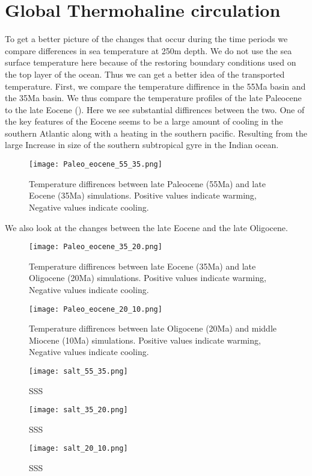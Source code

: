 \section{Global Thermohaline circulation}
To get a better picture of the changes that occur during the time periods we compare differences in sea temperature at 250m depth. We do not use the sea surface temperature here because of the restoring boundary conditions used on the top layer of the ocean. Thus we can get a better idea of the transported temperature. First, we compare the temperature diffirence in the 55Ma basin and the 35Ma basin. We thus compare the temperature profiles of the late Paleocene to the late Eocene (). Here we see substantial diffirences between the two. One of the key features of the Eocene seems to be a large amount of cooling in the southern Atlantic along with a heating in the southern pacific. Resulting from the large Increase in size of the southern subtropical gyre in the Indian ocean. 

\begin{figure}[H]
	\texttt{[image: Paleo\_eocene\_55\_35.png]}
	\caption{Temperature diffirences between late Paleocene (55Ma) and late Eocene (35Ma) simulations. Positive values indicate warming, Negative values indicate cooling.}
	\label{fig:5535cooling}
\end{figure}

We also look at the changes between the late Eocene and the late Oligocene. 

\begin{figure}[H]
	\texttt{[image: Paleo\_eocene\_35\_20.png]}
	\caption{Temperature diffirences between late Eocene (35Ma) and late Oligocene (20Ma) simulations. Positive values indicate warming, Negative values indicate cooling.}
	\label{fig:3520cooling}
\end{figure}

\begin{figure}[H]
	\texttt{[image: Paleo\_eocene\_20\_10.png]}
	\caption{Temperature diffirences between late Oligocene (20Ma) and middle Miocene (10Ma) simulations. Positive values indicate warming, Negative values indicate cooling.}
	\label{fig:2010cooling}
\end{figure}


\begin{figure}[H]
	\texttt{[image: salt\_55\_35.png]}
	\caption{SSS}
	\label{fig:salt5535cooling}
\end{figure}
\begin{figure}[H]
	\texttt{[image: salt\_35\_20.png]}
	\caption{SSS}
	\label{fig:salt3520cooling}
\end{figure}
\begin{figure}[H]
	\texttt{[image: salt\_20\_10.png]}
	\caption{SSS}
	\label{fig:salt2010cooling}
\end{figure}

